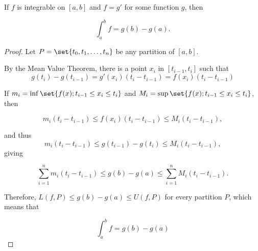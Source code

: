 \documentclass[11pt]{scrartcl}
\begin{document}
\begin{theorem}
  If $f$ is integrable on $[a,b]$ and $f = g'$ for some function $g$, then

  \begin{equation*}
\int_a^bf = g(b) - g(a).
  \end{equation*}

\end{theorem}
\begin{proof}
  Let $P = \set{t_0, t_1, \dots, t_n}$ be any partition of $[a,b]$.

  By the Mean Value Theorem, there is a point $x_i$ in
  $[t_{i-1}, t_i]$ such that
  \begin{equation*}
    g(t_i) - g(t_{i-1}) = g'(x_i)(t_i-t_{i-1}) = f(x_i)(t_i-t_{i-1})
  \end{equation*}

  If $m_i= \inf\set{f(x);t_{i-1}\leq x_i\leq t_i}$ and
  $M_i= \sup\set{f(x);t_{i-1}\leq x_i\leq t_i}$, then

  \begin{equation*}
    m_i(t_i-t_{i-1})\leq f(x_i)(t_{i} - t_{i-1}) \leq M_{i}(t_{i} - t_{i-1}),
  \end{equation*}

  and thus
  \begin{equation*}
    m_i(t_i-t_{i-1})\leq g(t_{i-1})-g(t_i) \leq M_{i}(t_{i} - t_{i-1}),
  \end{equation*}
  giving

  \begin{equation*}
    \sum_{i=1}^nm_{i}(t_{i} - t_{i-1}) \leq g(b) - g(a) \leq    \sum_{i=1}^nM_{i}(t_{i} - t_{i-1}).
  \end{equation*}

  Therefore, $L(f, P) \leq g(b) - g(a) \leq U(f, P)$ for every partition $P$, which means that


  \begin{equation*}
    \int_a^bf = g(b) - g(a)
  \end{equation*}


\end{proof}
\end{document}
